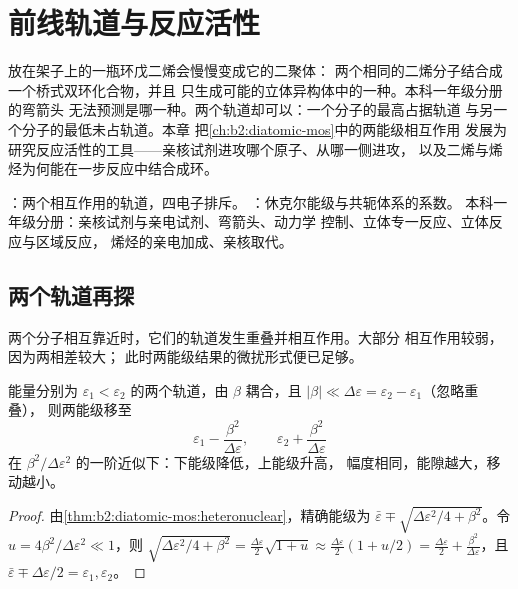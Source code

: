 \chapter{前线轨道与反应活性}\label{ch:b2:frontier-orbitals}

放在架子上的一瓶环戊二烯会慢慢变成它的二聚体：
两个相同的二烯分子结合成一个桥式双环化合物，并且
只生成可能的立体异构体中的一种。本科一年级分册的弯箭头
无法预测是哪一种。两个轨道却可以：一个分子的最高占据轨道
与另一个分子的最低未占轨道。本章
把\cref{ch:b2:diatomic-mos}中的两能级相互作用
发展为研究反应活性的工具——亲核试剂进攻哪个原子、从哪一侧进攻，
以及二烯与烯烃为何能在一步反应中结合成环。

\begin{recall}
：两个相互作用的轨道，四电子排斥。
：休克尔能级与共轭体系的系数。
本科一年级分册：亲核试剂与亲电试剂、弯箭头、动力学
控制、立体专一反应、立体反应与区域反应，
烯烃的亲电加成、亲核取代。
\end{recall}

\section{两个轨道再探}

两个分子相互靠近时，它们的轨道发生重叠并相互作用。大部分
相互作用较弱，因为两相差较大；
此时两能级结果的微扰形式便已足够。

\begin{theorem}[两能级的弱相互作用]\label{thm:b2:frontier-orbitals:perturbation}
能量分别为 $\varepsilon_1 < \varepsilon_2$ 的两个轨道，由
$\beta$ 耦合，且 $|\beta| \ll \Delta\varepsilon = \varepsilon_2 - \varepsilon_1$（忽略重叠），
则两能级移至
\[
  \varepsilon_1 - \frac{\beta^2}{\Delta\varepsilon}, \qquad \varepsilon_2 + \frac{\beta^2}{\Delta\varepsilon}
\]
在 $\beta^2/\Delta\varepsilon^2$ 的一阶近似下：下能级降低，上能级升高，
幅度相同，能隙越大，移动越小。
\end{theorem}

\begin{proof}
由\cref{thm:b2:diatomic-mos:heteronuclear}，精确能级为 $\bar\varepsilon \mp
\sqrt{\Delta\varepsilon^2/4 + \beta^2}$。令 $u = 4\beta^2/\Delta\varepsilon^2 \ll 1$，则 $\sqrt{\Delta\varepsilon^2/4
+ \beta^2} = \frac{\Delta\varepsilon}{2}\sqrt{1 + u} \approx \frac{\Delta\varepsilon}{2}(1 + u/2) =
\frac{\Delta\varepsilon}{2} + \frac{\beta^2}{\Delta\varepsilon}$，且 $\bar\varepsilon \mp \Delta\varepsilon/2 = \varepsilon_1,
\varepsilon_2$。
\end{proof}

